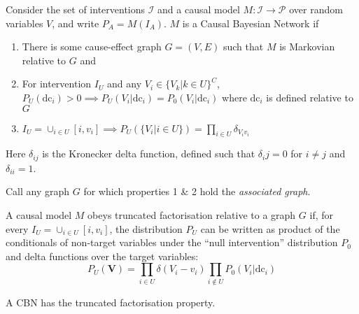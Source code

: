 \begin{definition}\label{def:CBN}
Consider the set of interventions $\mathcal{I}$ and a causal model $M:\mathcal{I}\to\mathcal{P}$ over random variables $V$, and write $P_A=M(I_A)$. $M$ is a Causal Bayesian Network if
\begin{enumerate}
    \item There is some cause-effect graph $G=(V,E)$ such that $M$ is Markovian relative to $G$ and
    \item For intervention $I_U$ and any $V_i \in \{V_k|k\in U\}^C$, $P_U(\mathrm{dc}_i) > 0 \implies P_U(V_i|\mathrm{dc}_i) = P_0(V_i|\mathrm{dc}_i)$ where $\mathrm{dc}_i$ is defined relative to $G$
    \item $I_U = \cup_{i\in U}[i,v_i] \implies P_U(\{V_i|i\in U\}) = \prod_{i\in U} \delta_{V_iv_i}$
\end{enumerate}
Here $\delta_{ij}$ is the Kronecker delta function, defined such that $\delta_ij=0$ for $i\neq j$ and $\delta_{ii} = 1$.

Call any graph $G$ for which properties 1 \& 2 hold the \emph{associated graph}.
\end{definition}

\begin{definition}
A causal model $M$ obeys truncated factorisation relative to a graph $G$ if, for every $I_U=\cup_{i\in U} [i,v_i]$, the distribution $P_U$ can be written as product of the conditionals of non-target variables under the ``null intervention'' distribution $P_0$ and delta functions over the target variables:
\[P_U(\mathbf{V}) = \prod_{i\in U} \delta (V_i-v_i)\prod_{i\not\in U} P_0(V_i|\mathrm{dc}_i) \]
\end{definition}

\begin{theorem}
A CBN has the truncated factorisation property.
\end{theorem}

